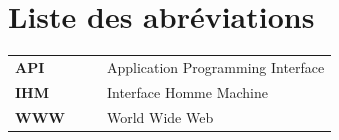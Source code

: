\chapter*{Liste des abréviations}
\lhead{}

\begin{tabular}{llll}
\textbf{API} & & & Application Programming Interface \\
\textbf{IHM} & & & Interface Homme Machine\\
\textbf{WWW}  & & &  World Wide Web
\end{tabular}